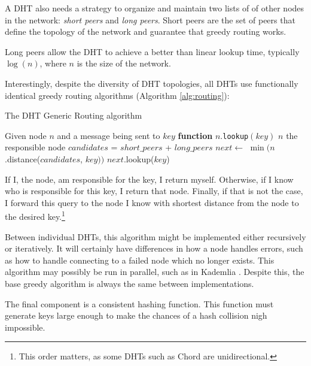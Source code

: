 \documentclass[11pt,conference]{IEEEtran}
\begin{document}
A DHT also needs a strategy to organize and maintain two lists of of other nodes in the network: \textit{short peers} and \textit{long peers}.
Short peers are the set of peers that define the topology of the network and guarantee that greedy routing works.

Long peers allow the DHT to achieve a better than linear lookup time, typically $ \log(n) $, where $n$ is the size of the network. 

Interestingly, despite the diversity of DHT topologies, all DHTs use functionally identical greedy routing algorithms (Algorithm \ref{alg:routing}):

\begin{algorithm}
	\caption{The DHT Generic Routing algorithm}
	\label{alg:routing}
	\begin{algorithmic}[1]
		\STATE Given node $n$ and a message being sent to $key$
		\STATE \textbf{function} $n.$\texttt{lookup}$(key)$
			\RETURN $ n $
		\ENDIF
			\RETURN the responsible node
		\ENDIF
		\STATE $ candidates $ = $ short\_peers $ + $ long\_peers $
		\STATE $ next  \leftarrow $  $\min (n$.distance($candidates$, $ key ))$
		\RETURN $next.$lookup($key$)
	\end{algorithmic}
	
	\scriptsize
\end{algorithm}
If I, the node, am responsible for the key, I return myself.
Otherwise, if I know who is responsible for this key, I return that node.
Finally, if that is not the case, I forward this query to the node I know with shortest distance from the node to the desired key.\footnote{This order matters, as some DHTs such as Chord are unidirectional.} 

Between individual DHTs, this algorithm might be implemented either recursively or iteratively.
It will certainly have differences in how a node handles errors, such as how to handle connecting to a failed node which no longer exists.
This algorithm may possibly be  run in parallel, such as in Kademlia \cite{kademlia}.
Despite this, the base greedy algorithm is always the same between implementations.

The final component is a consistent hashing function.
This function must generate keys large enough to make the chances of a hash collision nigh impossible.
\end{document}
